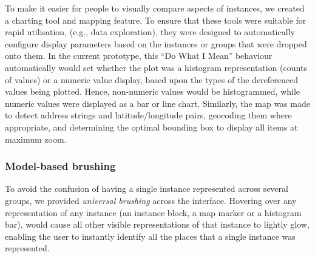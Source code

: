 \documentclass{sigchi}
\begin{document}
To make it easier for people to visually compare aspects of instances, we created a charting tool and mapping feature.  To ensure that these tools were suitable for rapid utilisation, (e.g., data exploration), they were designed to automatically configure display parameters based on the instances or groups that were dropped onto them. In the current prototype, this ``Do What I Mean'' behaviour automatically would set whether the plot was a histogram representation (counts of values) or a numeric value display, based upon the types of the dereferenced values being plotted.  Hence, non-numeric values would be histogrammed, while numeric values were displayed as a bar or line chart.  Similarly, the map was made to detect address strings and latitude/longitude pairs, geocoding them where appropriate, and determining the optimal bounding box to display all items at maximum zoom.

\subsubsection{Model-based brushing}
To avoid the confusion of having a single instance represented across several groups, we provided \emph{universal brushing} across the interface.  Hovering over any representation of any instance (an instance block, a map marker or a histogram bar), would cause all other visible representations of that instance to lightly glow, enabling the user to instantly identify all the places that a single instance was represented.



\end{document}
